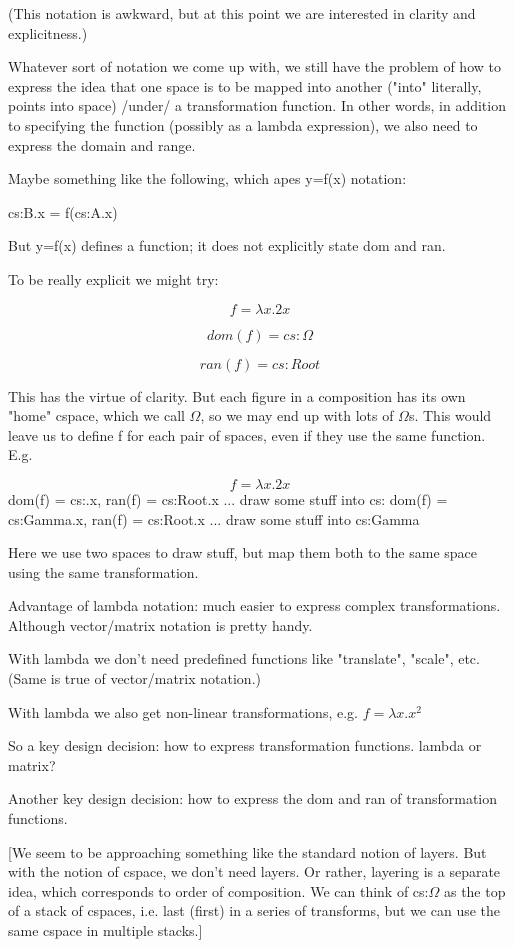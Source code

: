 \documentclass{tufte-handout}
\numberwithin{equation}{subsection}
\begin{document}
(This notation is awkward, but at this point we are interested in
clarity and explicitness.)

Whatever sort of notation we come up with, we still have the problem
of how to express the idea that one space is to be mapped into another
("into" literally, points into space) /under/ a transformation
function.  In other words, in addition to specifying the function
(possibly as a lambda expression), we also need to express the domain
and range.

Maybe something like the following, which apes y=f(x) notation:

cs:B.x = f(cs:A.x)

But y=f(x) defines a function; it does not explicitly state dom and ran.

To be really explicit we might try:

$$f = \lambda x.2x$$

$$dom(f) = cs:\Omega$$

$$ran(f) = cs:Root$$

This has the virtue of clarity.  But each figure in a composition has
its own "home" cspace, which we call $\Omega$, so we may end up with lots
of $\Omega$s.  This would leave us to define f for each pair of spaces,
even if they use the same function.  E.g.


$$f = \lambda x.2x$$
dom(f) = cs:\Omega.x, ran(f) = cs:Root.x
... draw some stuff into cs:\Omega
dom(f) = cs:Gamma.x, ran(f) = cs:Root.x
... draw some stuff into cs:Gamma

Here we use two spaces to draw stuff, but map them both to the same
space using the same transformation.

Advantage of lambda notation: much easier to express complex
transformations.  Although vector/matrix notation is pretty handy.

With lambda we don't need predefined functions like "translate",
"scale", etc.  (Same is true of vector/matrix notation.)

With lambda we also get non-linear transformations, e.g. 
\(f = \lambda x.x^2\)

So a key design decision: how to express transformation functions.
lambda or matrix?

Another key design decision: how to express the dom and ran of
transformation functions.

[We seem to be approaching something like the standard notion of
  layers.  But with the notion of cspace, we don't need layers.  Or
  rather, layering is a separate idea, which corresponds to order of
  composition.  We can think of cs:$\Omega$ as the top of a stack of
  cspaces, i.e. last (first) in a series of transforms, but we can use
  the same cspace in multiple stacks.]
\end{document}
